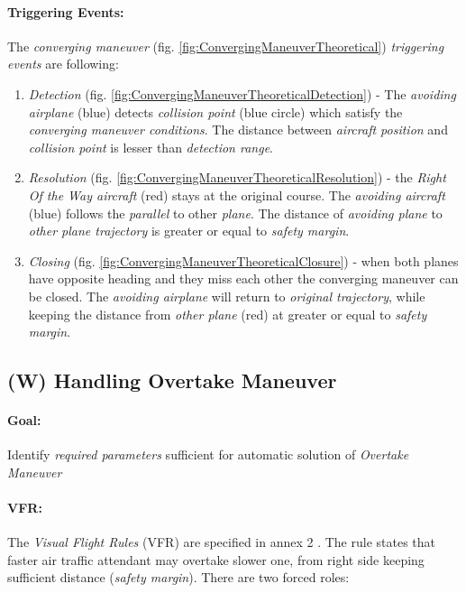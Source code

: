 \paragraph{Triggering Events:} The \emph{converging maneuver} (fig. \ref{fig:ConvergingManeuverTheoretical}) \emph{triggering events} are following:

\begin{enumerate}
    \item \emph{Detection} (fig. \ref{fig:ConvergingManeuverTheoreticalDetection}) -  The \emph{avoiding airplane} (blue) detects \emph{collision point} (blue circle) which satisfy the \emph{converging maneuver conditions}. The distance between \emph{aircraft position} and \emph{collision point} is lesser than \emph{detection range}.
    
    \item \emph{Resolution} (fig. \ref{fig:ConvergingManeuverTheoreticalResolution}) - the \emph{Right Of the Way aircraft} (red) stays at the original course. The \emph{avoiding aircraft} (blue) follows the \emph{parallel} to other \emph{plane}. The distance of \emph{avoiding plane} to \emph{other plane trajectory} is greater or equal to \emph{safety margin}.
    
    \item \emph{Closing} (fig. \ref{fig:ConvergingManeuverTheoreticalClosure}) - when both planes have opposite heading and they miss each other the converging maneuver can be closed. The \emph{avoiding airplane} will return to \emph{original trajectory}, while keeping the distance from \emph{other plane} (red) at greater or equal to \emph{safety margin}.
\end{enumerate}


\subsection{(W) Handling Overtake Maneuver}\label{sec:handlingOvertakeManuever}

\paragraph{Goal:} Identify \emph{required parameters} sufficient for automatic solution of \emph{Overtake Maneuver}

\paragraph{VFR:} The \emph{Visual Flight Rules} (VFR) are specified in annex 2 \cite{icaoAnnex2}. The rule states that faster air traffic attendant may overtake slower one, from right side keeping sufficient distance (\emph{safety margin}). There are two forced roles:


